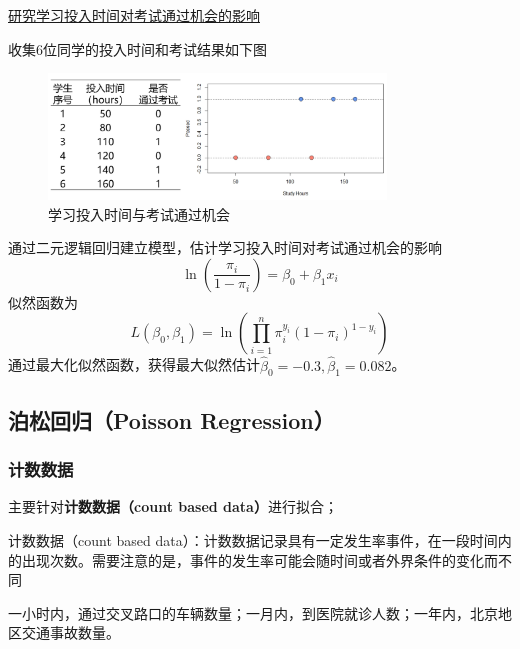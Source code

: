 \begin{example}
    \href{https://rpubs.com/beane/n4_1}{研究学习投入时间对考试通过机会的影响}

    收集$6$位同学的投入时间和考试结果如下图

    \begin{figure}[ht]
        \centering
        \includegraphics[width=0.8\textwidth]{pic/2.6.1.png}
        \caption{学习投入时间与考试通过机会}
    \end{figure}

    通过二元逻辑回归建立模型，估计学习投入时间对考试通过机会的影响
    \begin{equation}
        \ln \left(\frac{\pi_i}{1-\pi_i}\right) = \beta_0 + \beta_1 x_i
    \end{equation}
    似然函数为
    \begin{equation}
        L(\beta_0,\beta_1) = \ln \left(\prod_{i=1}^n \pi_i^{y_i}(1-\pi_i)^{1-y_i}\right)
    \end{equation}
    通过最大化似然函数，获得最大似然估计$\hat{\beta}_0 = -0.3,\hat{\beta}_1 = 0.082$。

\end{example}

\subsection{泊松回归（Poisson Regression）}

\subsubsection{计数数据}

主要针对\textbf{计数数据（count based data）}进行拟合；

计数数据（count based data）：计数数据记录具有一定发生率事件，在一段时间内的出现次数。需要注意的是，事件的发生率可能会随时间或者外界条件的变化而不同
\begin{example}
    一小时内，通过交叉路口的车辆数量；一月内，到医院就诊人数；一年内，北京地区交通事故数量。
\end{example}

